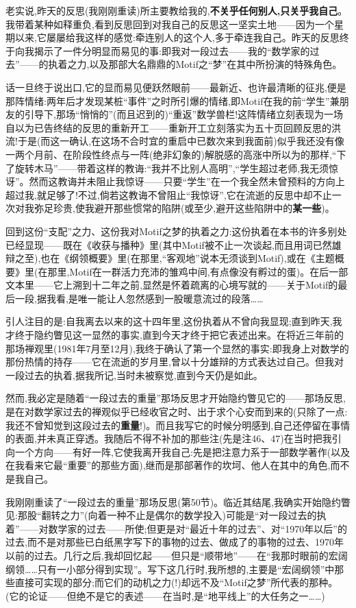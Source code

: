 老实说,昨天的反思(我刚刚重读)所主要教给我的,\textbf{不关乎任何别人,只关乎我自己}。我带着某种如释重负,看到反思回到对我自己的反思这一坚实土地——因为一个星期以来,它屡屡给我这样的感觉:牵连别人的这个人,多于牵连我自己。昨天的反思终于向我揭示了一件分明显而易见的事:即我对一段过去——我的“数学家的过去”——的执着之力,以及那部大名鼎鼎的Motif之“梦”在其中所扮演的特殊角色。

话一旦终于说出口,它的显而易见便跃然眼前——最新近、也许最清晰的征兆,便是那阵情绪:两年后才发现某桩“事件”之时所引爆的情绪,即Motif在我的前“学生”兼朋友的引导下,那场“悄悄的”(而且迟到的)“重返”数学兽栏!这阵情绪立刻表现为一场自以为已告终结的反思的重新开工——重新开工立刻落实为五十页回顾反思的洪流!于是(而这一确认,在这场不合时宜的重启中已数次来到我面前)似乎我还没有像一两个月前、在阶段性终点与一阵(绝非幻象的)解脱感的高涨中所以为的那样,“下了旋转木马”\dmark{}——带着这样的教诲:“我并不比别人高明”,“学生超过老师,我无须惊讶”。然而这教诲并未阻止我惊讶——只要“学生”在一个我全然未曾预料的方向上超过我,就足够了!不过,倘若这教诲不曾阻止“我惊讶”,它在流逝的反思中却不止一次对我弥足珍贵,使我避开那些惯常的陷阱(或至少,避开这些陷阱中的\textbf{某一些})。

回到这份“支配”之力、这份我对Motif之梦的执着之力:这份执着在本书的许多别处已经显现——既在《收获与播种》里(其中Motif被不止一次谈起,而且用词已然雄辩之至),也在《纲领概要》里(在那里,“客观地”说本无须谈到Motif),或在《主题概要》里(在那里,Motif在一群活力充沛的雏鸡中间,有点像没有孵过的蛋)。在后一部文本里——它上溯到十二年之前,显然是怀着疏离的心境写就的——关于Motif的最后一段,据我看,是唯一能让人忽然感到一股暖意流过的段落……

引人注目的是:自我离去以来的这十四年里,这份执着从不曾向我显现;直到昨天,我才终于隐约瞥见这一显然的事实,直到今天才终于把它表述出来。在将近三年前的那场禅观里(1981年7月至12月),我终于确认了第一个显然的事实:即我身上对数学的那份热情的持存——它在流逝的岁月里,曾以十分雄辩的方式表达过自己。但我对一段过去的执着,据我所记,当时未被察觉,直到今天仍是如此。

然而,我必定是随着“一段过去的重量”那场反思才开始隐约瞥见它的——那场反思,是在对数学家过去的禅观似乎已经收官之时、出于求个心安而到来的(只除了一点:我还不曾知觉到这段过去的\textbf{重量}!)。而且我写它的时候分明感到,自己还停留在事情的表面,并未真正穿透。我随后不得不补加的那些注(先是注46、47)在当时把我引向一个方向——有好一阵,它使我离开我自己:先是把注意力系于一部数学著作(以及在我看来它最“重要”的那些方面),继而是那部著作的坎坷、他人在其中的角色,而不是我自己。

\dmark{}我刚刚重读了“一段过去的重量”那场反思(第50节)。临近其结尾,我确实开始隐约瞥见:那股“翻转之力”(向着一种不止是偶尔的数学投入)可能是“对一段过去的执着”——对数学家的过去——所使;但更是对“最近十年的过去”、对“1970年以后”的过去,而不是对那些已白纸黑字写下的事物的过去、做成了的事物的过去、1970年以前的过去。几行之后,我却回忆起——但只是“顺带地”——在“我那时眼前的宏阔纲领……只有一小部分得到实现”。写下这几行时,我所想的,主要是“宏阔纲领”中那些直接可实现的部分;而它们的动机之力(!)却远不及“Motif之梦”所代表的那种。(它的论证——但绝不是它的表述——在当时,是“地平线上”的大任务之一……)

